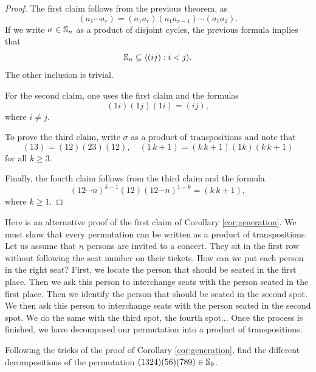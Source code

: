 \begin{proof}
        The first claim follows from the previous theorem, as 
        \[
        (a_1\cdots a_r)=(a_1a_r)(a_1a_{r-1})\cdots(a_1a_2).
        \]
        If we write $\sigma\in\mathbb{S}_n$ as a product of disjoint cycles, 
        the previous formula implies 
        that 
        \[
        \mathbb{S}_n\subseteq\langle (ij):i<j\rangle.
        \]
        The other 
        inclusion is trivial. 

        For the second claim, one uses the first claim and the
        formulas 
        \[
        (1i)(1j)(1i)=(ij), 
        \]
        where $i\ne j$.

        To prove the third claim, write $\sigma$ as a product 
        of transpositions and 
        note that 
        \[
        (13)=(12)(23)(12),\quad
        (1\,k+1)=(k\,k+1)(1k)(k\,k+1)
        \]
        for all $k\geq3$.

        Finally, the fourth claim follows from 
        the third claim and 
        the formula 
        \[
        (12\cdots n)^{k-1}(12)(12\cdots n)^{1-k}=(k\,k+1),
        \]
        where $k\geq1$.
\end{proof}

Here is an alternative proof of
the first claim of Corollary 
\ref{cor:generation}. We must show that every 
permutation can be written as a product of transpositions. 
Let us assume that $n$ persons are invited to a concert. They sit
in the first row without following  
the seat number on their tickets. How can we put each person in 
the right seat? First, we locate the person that should be seated 
in the first place. Then we ask this person to 
interchange seats with the person seated in the first place. 
Then we identify the person 
that should be seated in the second spot. We then ask this person
to interchange seats with the person 
seated in the second spot. We do the same with the third spot, the fourth
spot... Once the process is finished, 
we have decomposed 
our permutation into a product of transpositions. 

\begin{exercise}
    Following the tricks of the proof of 
    Corollary \ref{cor:generation}, find the different
    decompositions of the permutation
    $(1324)(56)(789)\in\mathbb{S}_9$. 
\end{exercise}

